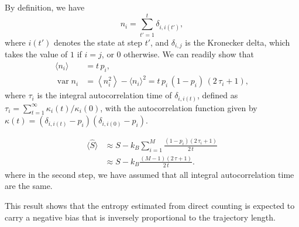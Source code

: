 \documentclass[reprint, superscriptaddress]{revtex4-1}
\begin{document}
By definition, we have
$$n_i = \sum_{t' = 1}^t \delta_{i, i(t')},$$
where $i(t')$ denotes the state at step $t'$,
and $\delta_{i, j}$ is the Kronecker delta,
which takes the value of $1$ if $i = j$, or $0$ otherwise.
%
We can readily show that
\begin{align*}
  \langle n_i \rangle
  &=
  t \, p_i, \\
  \operatorname{var}{n_i}
  &=
  \left\langle n_i^2 \right\rangle - \langle n_i \rangle^2
  =
  t \, p_i \, (1 - p_i) \, (2 \, \tau_{i} + 1)
  ,
\end{align*}
%
where $\tau_i$ is the integral autocorrelation time of $\delta_{i, i(t)}$,
defined as $\tau_i = \sum_{t = 1}^\infty \kappa_i(t)/\kappa_i(0)$,
with the autocorrelation function given by
$\kappa(t) = (\delta_{i, i(t)} - p_i) (\delta_{i, i(0)} - p_i)$.

\begin{align*}
  \langle \hat S \rangle
  &\approx
  S - k_B \sum_{i = 1}^M
    \frac{ (1 - p_i) ( 2 \, \tau_i + 1) } { 2 \, t }
  \\
  &\approx
  S - k_B
    \frac{ (M - 1) ( 2 \, \tau + 1) } { 2 \, t }
  .
\end{align*}
where in the second step,
we have assumed that all integral autocorrelation time are the same.

This result shows that the entropy estimated from direct counting
is expected to carry a negative bias
that is inversely proportional to the trajectory length.
\end{document}
